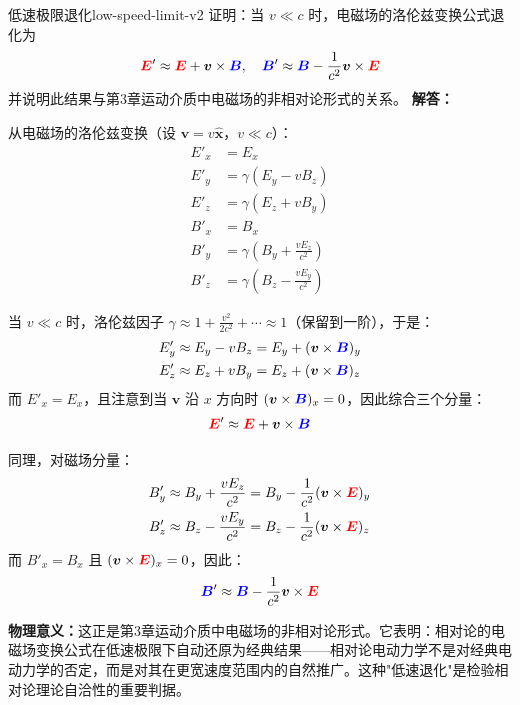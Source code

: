 \documentclass[11pt,a4paper,openany,oneside]{book}
\newcommand{\vecE}{\textcolor{red}{\vect{E}}}
\newcommand{\vecB}{\textcolor{blue}{\vect{B}}}
\newcommand{\vect}[1]{\bm{#1}}
\newcommand{\unitvec}[1]{\hat{\vect{#1}}}
\newcommand{\difficulty}[1]{\marginnote{\textcolor{red}{\textbf{[#1]}}}}
\begin{document}
\begin{example}{低速极限退化}{low-speed-limit-v2}
\difficulty{基础}
证明：当 $v\ll c$ 时，电磁场的洛伦兹变换公式退化为
\[
\vecE'\approx\vecE+\vect{v}\times\vecB, \quad \vecB'\approx\vecB-\frac{1}{c^2}\vect{v}\times\vecE
\]
并说明此结果与第3章运动介质中电磁场的非相对论形式的关系。
\tcblower
\textbf{解答：}

从电磁场的洛伦兹变换（设 $\vect{v}=v\unitvec{x}$，$v\ll c$）：
\begin{align*}
E'_x &= E_x \\
E'_y &= \gamma(E_y - vB_z) \\
E'_z &= \gamma(E_z + vB_y) \\
B'_x &= B_x \\
B'_y &= \gamma\left(B_y + \frac{vE_z}{c^2}\right) \\
B'_z &= \gamma\left(B_z - \frac{vE_y}{c^2}\right)
\end{align*}

当 $v\ll c$ 时，洛伦兹因子 $\gamma\approx 1 + \frac{v^2}{2c^2} + \cdots \approx 1$（保留到一阶），于是：
\begin{align*}
E'_y &\approx E_y - vB_z = E_y + (\vect{v}\times\vecB)_y \\
E'_z &\approx E_z + vB_y = E_z + (\vect{v}\times\vecB)_z
\end{align*}
而 $E'_x = E_x$，且注意到当 $\vect{v}$ 沿 $x$ 方向时 $(\vect{v}\times\vecB)_x = 0$，因此综合三个分量：
\[
\vecE' \approx \vecE + \vect{v}\times\vecB
\]

同理，对磁场分量：
\begin{align*}
B'_y &\approx B_y + \frac{vE_z}{c^2} = B_y - \frac{1}{c^2}(\vect{v}\times\vecE)_y \\
B'_z &\approx B_z - \frac{vE_y}{c^2} = B_z - \frac{1}{c^2}(\vect{v}\times\vecE)_z
\end{align*}
而 $B'_x = B_x$ 且 $(\vect{v}\times\vecE)_x=0$，因此：
\[
\vecB' \approx \vecB - \frac{1}{c^2}\vect{v}\times\vecE
\]

\textbf{物理意义：}这正是第3章运动介质中电磁场的非相对论形式。它表明：相对论的电磁场变换公式在低速极限下自动还原为经典结果——相对论电动力学不是对经典电动力学的否定，而是对其在更宽速度范围内的自然推广。这种"低速退化"是检验相对论理论自洽性的重要判据。
\end{example}
\end{document}

